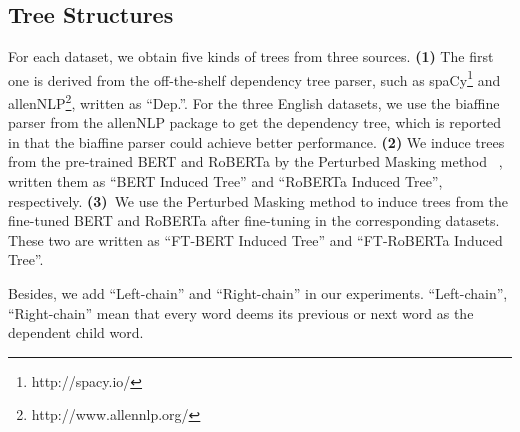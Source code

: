 \documentclass[11pt]{article}
\begin{document}
\subsection{Tree Structures} \label{sec:tree_structure}
For each dataset, we obtain five kinds of trees from three sources. \textbf{(1)} The first one is derived from the off-the-shelf dependency tree parser, such as spaCy\footnote{http://spacy.io/} and allenNLP\footnote{http://www.allennlp.org/}, written as ``Dep.''. For the three English datasets, we use the biaffine parser from the allenNLP package to get the dependency tree, which is reported in \citet{DBLP:conf/acl/WangSYQW20}  that the biaffine parser could achieve better performance.
\textbf{(2)} We induce trees from the pre-trained BERT and RoBERTa by the Perturbed Masking method ~\citep{DBLP:conf/acl/WuCKL20}, written them as ``BERT Induced Tree'' and ``RoBERTa Induced Tree'', respectively.
\textbf{(3)}~We use the  Perturbed Masking method to induce trees from the fine-tuned BERT and RoBERTa after fine-tuning in the corresponding datasets.
These two are written as ``FT-BERT Induced Tree'' and ``FT-RoBERTa Induced Tree''.

Besides, we add ``Left-chain'' and ``Right-chain'' in our experiments. ``Left-chain'', ``Right-chain'' mean that every word deems its previous or next word as the dependent child word.
\end{document}
